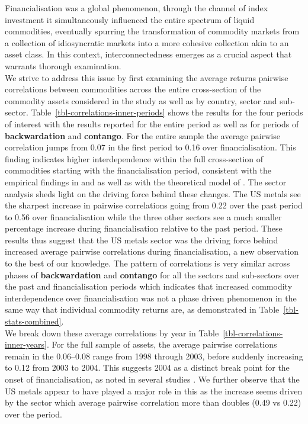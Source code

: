 \documentclass[
  authoryear,
  preprint,
  3p]{elsarticle}
\begin{document}
\medskip

Financialisation was a global phenomenon, through the channel of index
investment it simultaneously influenced the entire spectrum of liquid
commodities, eventually spurring the transformation of commodity markets
from a collection of idiosyncratic markets into a more cohesive
collection akin to an asset class. In this context, interconnectedness
emerges as a crucial aspect that warrants thorough examination.\\
We strive to address this issue by first examining the average returns
pairwise correlations between commodities across the entire
cross-section of the commodity assets considered in the study as well as
by country, sector and sub-sector.
Table~\ref{tbl-correlations-inner-periods} shows the results for the
four periods of interest with the results reported for the entire period
as well as for periods of \textbf{backwardation} and \textbf{contango}.
For the entire sample the average pairwise correlation jumps from 0.07
in the first period to 0.16 over financialisation. This finding
indicates higher interdependence within the full cross-section of
commodities starting with the financialisation period, consistent with
the empirical findings in \citet{fryMcKibbin_evolution_2023} and
\citet{mayer_financialization_2017} as well as with the theoretical
model of \citet{basak_model_2016}. The sector analysis sheds light on
the driving force behind these changes. The US metals see the sharpest
increase in pairwise correlations going from 0.22 over the past period
to 0.56 over financialisation while the three other sectors see a much
smaller percentage increase during financialisation relative to the past
period. These results thus suggest that the US metals sector was the
driving force behind increased average pairwise correlations during
financialisation, a new observation to the best of our knowledge. The
pattern of correlations is very similar across phases of
\textbf{backwardation} and \textbf{contango} for all the sectors and
sub-sectors over the past and financialisation periods which indicates
that increased commodity interdependence over financialisation was not a
phase driven phenomenon in the same way that individual commodity
returns are, as demonstrated in Table~\ref{tbl-stats-combined}.\\
We break down these average correlations by year in
Table~\ref{tbl-correlations-inner-years}. For the full sample of assets,
the average pairwise correlations remain in the 0.06--0.08 range from
1998 through 2003, before suddenly increasing to 0.12 from 2003 to 2004.
This suggests 2004 as a distinct break point for the onset of
financialisation, as noted in several studies
\citep{baker_financialization_2021, tang_index_2012}. We further observe
that the US metals appear to have played a major role in this as the
increase seems driven by the sector which average pairwise correlation
more than doubles (0.49 vs 0.22) over the period.
\end{document}
